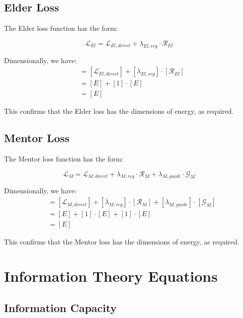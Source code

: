\subsection{Elder Loss}

The Elder loss function has the form:

\begin{equation}
\mathcal{L}_{El} = \mathcal{L}_{El,direct} + \lambda_{El,reg} \cdot \mathcal{R}_{El}
\end{equation}

Dimensionally, we have:
\begin{align}
[\mathcal{L}_{El}] &= [\mathcal{L}_{El,direct}] + [\lambda_{El,reg}] \cdot [\mathcal{R}_{El}] \\
&= [E] + [1] \cdot [E] \\
&= [E]
\end{align}

This confirms that the Elder loss has the dimensions of energy, as required.

\subsection{Mentor Loss}

The Mentor loss function has the form:

\begin{equation}
\mathcal{L}_{M} = \mathcal{L}_{M,direct} + \lambda_{M,reg} \cdot \mathcal{R}_{M} + \lambda_{M,guide} \cdot \mathcal{G}_{M}
\end{equation}

Dimensionally, we have:
\begin{align}
[\mathcal{L}_{M}] &= [\mathcal{L}_{M,direct}] + [\lambda_{M,reg}] \cdot [\mathcal{R}_{M}] + [\lambda_{M,guide}] \cdot [\mathcal{G}_{M}] \\
&= [E] + [1] \cdot [E] + [1] \cdot [E] \\
&= [E]
\end{align}

This confirms that the Mentor loss has the dimensions of energy, as required.

\section{Information Theory Equations}

\subsection{Information Capacity}

